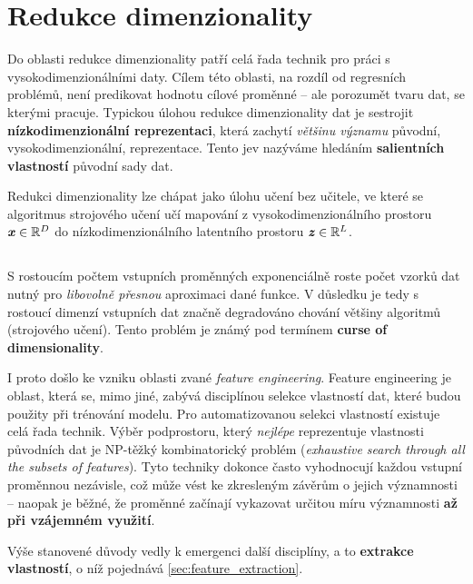 \section{Redukce dimenzionality}
\label{sec:dimensionality_reduction}

Do oblasti redukce dimenzionality patří celá řada technik pro práci s vysokodimenzionálními daty.
Cílem této oblasti, na rozdíl od regresních problémů, není predikovat hodnotu cílové proměnné – ale porozumět tvaru dat, se kterými pracuje.
Typickou úlohou redukce dimenzionality dat je sestrojit \textbf{nízkodimenzionální reprezentaci}, která zachytí \emph{většinu významu} původní, vysokodimenzionální, reprezentace.
Tento jev nazýváme hledáním \textbf{salientních vlastností} původní sady dat. \cite{Phillips2021}

Redukci dimenzionality lze chápat jako úlohu učení bez učitele, ve které se algoritmus strojového učení učí mapování z vysokodimenzionálního prostoru $\textbf{\emph{x}} \in \mathbb{R}^D$ do nízkodimenzionálního latentního prostoru $\textbf{\emph{z}} \in \mathbb{R}^L$. \cite{Murphy2022}

\subsection{}
S rostoucím počtem vstupních proměnných exponenciálně roste počet vzorků dat nutný pro \emph{libovolně přesnou} aproximaci dané funkce.
V důsledku je tedy s rostoucí dimenzí vstupních dat značně degradováno chování většiny algoritmů (strojového učení).
Tento problém je známý pod termínem \textbf{curse of dimensionality}. \cite{Bellman1957}

I proto došlo ke vzniku oblasti zvané \emph{feature engineering}.
Feature engineering je oblast, která se, mimo jiné, zabývá disciplínou selekce vlastností dat, které budou použity při trénování modelu.
Pro automatizovanou selekci vlastností existuje celá řada technik.
Výběr podprostoru, který \emph{nejlépe} reprezentuje vlastnosti původních dat je NP-těžký kombinatorický problém (\emph{exhaustive search through all the subsets of features}).
Tyto techniky dokonce často vyhodnocují každou vstupní proměnnou nezávisle, což může vést ke zkresleným závěrům o jejich významnosti – naopak je běžné, že proměnné začínají vykazovat určitou míru významnosti \textbf{až při vzájemném využití}. \cite{Stanczyk2015}

Výše stanovené důvody vedly k emergenci další disciplíny, a to \textbf{extrakce vlastností}, o níž pojednává \autoref{sec:feature_extraction}. 

